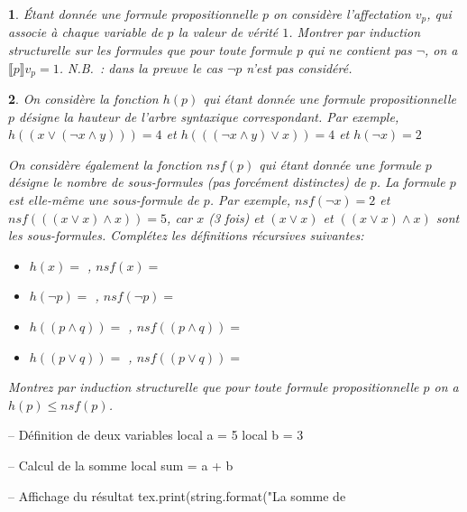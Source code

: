 \documentclass[a4paper,10pt,french]{article}
\newtheorem{exi}{}
\newenvironment{exo}{\begin{exi}\em}{\end{exi}}
\newcommand{\rsem}{\rrbracket}
\newcommand{\inte}[2]{\llbracket #1 \rsem {#2}}
\begin{document}
\begin{exo}
  Étant donnée une formule propositionnelle $p$ 
  on considère l'affectation $v_p$, qui associe à chaque variable de
  $p$ la valeur de vérité $1$.
  Montrer par induction structurelle sur les formules que pour toute formule
  $p$ qui ne contient pas $\neg$, on a $\inte{p}{v_p}=1$.
  N.B.~: dans la preuve le cas $\neg p$ n'est pas considéré.
  
  \framebox[\textwidth]{
  \rule[-0.4cm]{0mm}{8.5cm}
  }
  
\end{exo}

\begin{exo}
  On considère la fonction $h(p)$ qui étant donnée une formule
  propositionnelle $p$ désigne la hauteur de l'arbre syntaxique correspondant.
  Par exemple, $h((x\vee(\neg x \land y)))=4$ et
  $h(((\neg x \land y) \vee x))=4$ et 
  $h(\neg x) = 2$

  On considère également la fonction $\mathit{nsf}(p)$ qui étant donnée une formule
  $p$ désigne le nombre de sous-formules (pas forcément distinctes)
  de $p$. La formule $p$ est elle-même une sous-formule
  de $p$. Par exemple, $\mathit{nsf}(\neg x) = 2$ et
  $\mathit{nsf}(((x \vee x) \land x)) = 5$, car $x$ (3 fois) et $(x \vee x)$
  et $((x \vee x) \land x)$ sont les sous-formules.
    Complétez les définitions récursives suivantes:
  \begin{itemize}
  \item $h(x) = $ \framebox[1cm]{\rule[-0.2cm]{0mm}{0.5cm}},
    $\mathit{nsf}(x) = $ \framebox[1cm]{\rule[-0.2cm]{0mm}{0.5cm}}
  \item $h(\neg p) = $ \framebox[3cm]{\rule[-0.2cm]{0mm}{0.5cm}},
    $\mathit{nsf}(\neg p) = $ \framebox[3cm]{\rule[-0.2cm]{0mm}{0.5cm}}
  \item $h((p \land q)) = $ \framebox[4cm]{\rule[-0.2cm]{0mm}{0.5cm}},
    $\mathit{nsf}((p \land q)) = $ \framebox[4cm]{\rule[-0.2cm]{0mm}{0.5cm}}
    \item $h((p \vee q)) = $ \framebox[4cm]{\rule[-0.2cm]{0mm}{0.5cm}},
        $\mathit{nsf}((p \vee q)) = $ \framebox[4cm]{\rule[-0.2cm]{0mm}{0.5cm}}
  \end{itemize}
  
  Montrez par induction structurelle que pour toute formule propositionnelle
  $p$ on a $h(p) \leq \mathit{nsf}(p)$.\\[2ex]
   \framebox[\textwidth]{
    \rule[-0.4cm]{0mm}{13cm}
   }
\end{exo}

\begin{luacode*}
  -- Définition de deux variables
  local a = 5
  local b = 3

  -- Calcul de la somme
  local sum = a + b

  -- Affichage du résultat
  tex.print(string.format("La somme de %
\end{luacode*}
\end{document}
